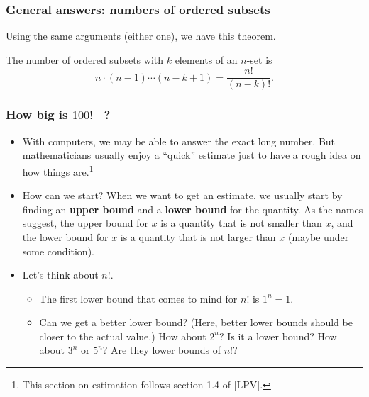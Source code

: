 \begin{frame}\frametitle{General answers: numbers of ordered subsets}
  Using the same arguments (either one), we have this theorem.

  \begin{theorem}
    The number of ordered subsets with $k$ elements of an $n$-set is
    \[
    n\cdot(n-1)\cdots(n - k + 1) = \frac{n!}{(n-k)!}.
    \]
  \end{theorem}
\end{frame}

\begin{frame}\frametitle{How big is $100!$ \ ?}
  \begin{itemize}
  \item
    With computers, we may be able to answer the exact long number.
    But mathematicians usually enjoy a ``quick'' estimate just to have
    a rough idea on how things are.\footnote{This section on estimation follows section 1.4 of [LPV].}

  \item
    How can we start? \pause When we want to get an estimate, we
    usually start by finding an {\bf upper bound} and a {\bf lower
      bound} for the quantity. \pause As the names suggest, the upper
    bound for $x$ is a quantity that is not smaller than $x$, and the
    lower bound for $x$ is a quantity that is not larger than $x$
    (maybe under some condition). \pause

  \item
    Let's think about $n!$.  \pause
    \begin{itemize}
    \item The first lower bound that comes to mind for $n!$ is $1^n = 1$.
      \pause
    \item Can we get a better lower bound?  (Here, better lower bounds
      should be closer to the actual value.) \pause How about $2^n$?
      Is it a lower bound? \pause How about $3^n$ or $5^n$? Are they
      lower bounds of $n!$?
    \end{itemize}
  \end{itemize}
\end{frame}

